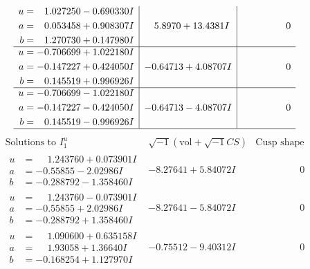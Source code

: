 \documentclass[1p]{elsarticle_modified}
\theoremstyle{definition}
\newcommand{\I}{\sqrt{-1}}
\begin{document}
$$\begin{array}{c|c|c}
\begin{aligned}
u &= \phantom{-}1.027250 - 0.690330 I \\
a &= \phantom{-}0.053458 + 0.908307 I \\
b &= \phantom{-}1.270730 + 0.147980 I\end{aligned}
 & \phantom{-}5.8970 + 13.4381 I & \phantom{-0.000000 } 0 \\ \hline\begin{aligned}
u &= -0.706699 + 1.022180 I \\
a &= -0.147227 + 0.424050 I \\
b &= \phantom{-}0.145519 + 0.996926 I\end{aligned}
 & -0.64713 + 4.08707 I & \phantom{-0.000000 } 0 \\ \hline\begin{aligned}
u &= -0.706699 - 1.022180 I \\
a &= -0.147227 - 0.424050 I \\
b &= \phantom{-}0.145519 - 0.996926 I\end{aligned}
 & -0.64713 - 4.08707 I & \phantom{-0.000000 } 0\\
 \hline 
 \end{array}$$\newpage$$\begin{array}{c|c|c}  
\text{Solutions to }I^u_{1}& \I (\text{vol} + \sqrt{-1}CS) & \text{Cusp shape}\\
 \hline 
\begin{aligned}
u &= \phantom{-}1.243760 + 0.073901 I \\
a &= -0.55855 - 2.02986 I \\
b &= -0.288792 - 1.358460 I\end{aligned}
 & -8.27641 + 5.84072 I & \phantom{-0.000000 } 0 \\ \hline\begin{aligned}
u &= \phantom{-}1.243760 - 0.073901 I \\
a &= -0.55855 + 2.02986 I \\
b &= -0.288792 + 1.358460 I\end{aligned}
 & -8.27641 - 5.84072 I & \phantom{-0.000000 } 0 \\ \hline\begin{aligned}
u &= \phantom{-}1.090600 + 0.635158 I \\
a &= \phantom{-}1.93058 + 1.36640 I \\
b &= -0.168254 + 1.127970 I\end{aligned}
 & -0.75512 - 9.40312 I & \phantom{-0.000000 } 0 \\ \hline\begin{aligned}

\end{aligned}
\end{array}$$
\end{document}
